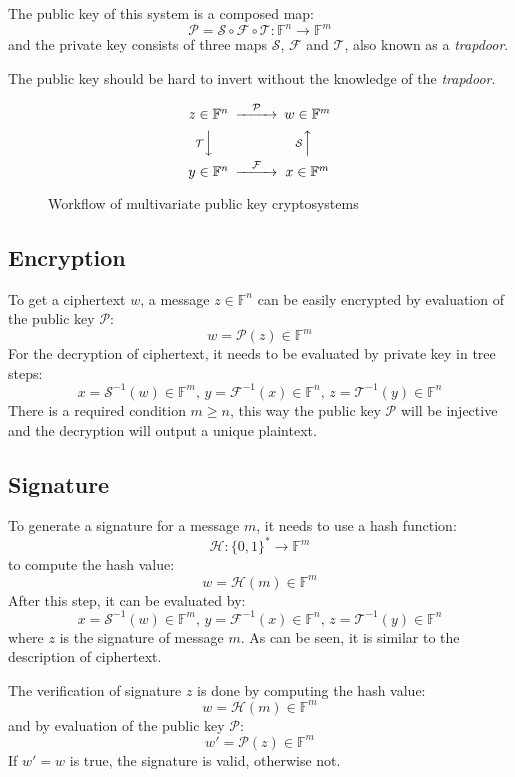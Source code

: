 \documentclass[thesis=M,english]{FITthesis}[2019/12/23]
\begin{document}
The public key of this system is a composed map:
\[
\mathcal{P} = \mathcal{S} \circ \mathcal{F} \circ \mathcal{T} : \mathbb{F}^n \rightarrow \mathbb{F}^m
\]
and the private key consists of three maps $\mathcal{S}$, $\mathcal{F}$ and $\mathcal{T}$, also known as a \textit{trapdoor}.

The public key should be hard to invert without the knowledge of the \textit{trapdoor}.

\begin{figure}[h]
\begin{equation*}
\begin{CD}
z \in \mathbb{F}^n @> \mathcal{P} >> w \in \mathbb{F}^m \\
@V\mathcal{T}VV @A\mathcal{S}AA \\
y \in \mathbb{F}^n @> \mathcal{F} >> x \in \mathbb{F}^m
\end{CD}
\end{equation*}
\caption{Workflow of multivariate public key cryptosystems}
\end{figure}
\smallskip

\subsection{Encryption}
To get a ciphertext $w$, a message $z \in \mathbb{F}^n$ can be easily encrypted by evaluation of the public key $\mathcal{P}$:
\[
w = \mathcal{P}(z) \in \mathbb{F}^m
\]
For the decryption of ciphertext, it needs to be evaluated by private key in tree steps:
\[
x = \mathcal{S}^{-1}(w) \in \mathbb{F}^m, \, y = \mathcal{F}^{-1}(x) \in \mathbb{F}^n, \, z = \mathcal{T}^{-1}(y) \in \mathbb{F}^n
\]
There is a required condition $m \geq n$, this way the public key $\mathcal{P}$ will be injective and the decryption will output a unique plaintext.

\subsection{Signature}
To generate a signature for a message $m$, it needs to use a hash function:
\[
\mathcal{H}: \{0,1\}^{*} \rightarrow \mathbb{F}^m
\]
to compute the hash value:
\[
w = \mathcal{H}(m) \in \mathbb{F}^m
\]
After this step, it can be evaluated by:
\[
x = \mathcal{S}^{-1}(w) \in \mathbb{F}^m, \, y = \mathcal{F}^{-1}(x) \in \mathbb{F}^n, \, z = \mathcal{T}^{-1}(y) \in \mathbb{F}^n
\]
where $z$ is the signature of message $m$. As can be seen, it is similar to the description of ciphertext.

The verification of signature $z$ is done by computing the hash value:
\[
w = \mathcal{H}(m) \in \mathbb{F}^m
\]
and by evaluation of the public key $\mathcal{P}$:
\[
w' = \mathcal{P}(z) \in \mathbb{F}^m
\]
If $w' = w$ is true, the signature is valid, otherwise not.
\end{document}
